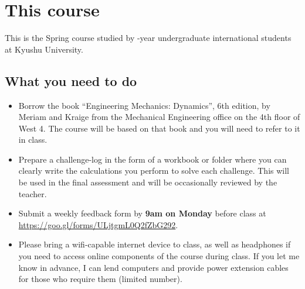 \section{This course}
This is the Spring \courseyear \course course studied by \nensei-year undergraduate international students at Kyushu University.

\subsection{What you need to do}
\begin{itemize}
    \item Borrow the book ``Engineering Mechanics: Dynamics'', 6th edition, by Meriam and Kraige from the Mechanical Engineering office on the 4th floor of West 4. The course will be based on that book and you will need to refer to it in class.
    \item Prepare a challenge-log in the form of a workbook or folder where you can clearly write the calculations you perform to solve each challenge. This will be used in the final assessment and will be occasionally reviewed by the teacher.
    \item Submit a weekly feedback form by \textbf{9am on Monday} before class at \url{https://goo.gl/forms/ULjtgmL0Q2fZbG292}.
    \item Please bring a wifi-capable internet device to class, as well as headphones if you need to access online components of the course during class. If you let me know in advance, I can lend computers and provide power extension cables for those who require them (limited number).
\end{itemize}


